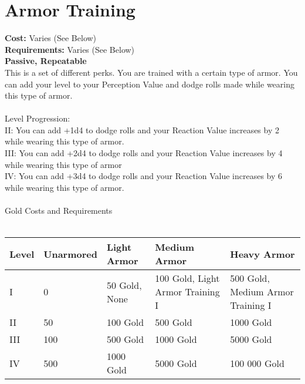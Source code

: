 \section{Armor Training}
\textbf{Cost:} Varies (See Below)\\
\textbf{Requirements:} Varies (See Below)\\
\textbf{Passive, Repeatable}\\
This is a set of different perks. You are trained with a certain type of armor. You can add your level to your Perception Value and dodge rolls made while wearing this type of armor.\\
\\
Level Progression:\\
II: You can add +1d4 to dodge rolls and your Reaction Value increases by 2 while wearing this type of armor.\\
III: You can add +2d4 to dodge rolls and your Reaction Value increases by 4 while wearing this type of armor\\
IV: You can add +3d4 to dodge rolls and your Reaction Value increases by 6 while wearing this type of armor.\\
\\
Gold Costs and Requirements\\
\\
\begin{tabular}{l | p{2cm} | p{2.4cm} | p{2.6cm} | p{2.6cm}}
	Level & Unarmored & Light Armor & Medium Armor & Heavy Armor\\ \hline
	I & 0 & 50 Gold, None & 100 Gold, Light Armor Training I & 500 Gold, Medium Armor Training I\\
	II & 50 & 100 Gold & 500 Gold & 1000 Gold\\
	III & 100 & 500 Gold & 1000 Gold & 5000 Gold\\
	IV & 500 & 1000 Gold & 5000 Gold & 100 000 Gold\\
\end{tabular}